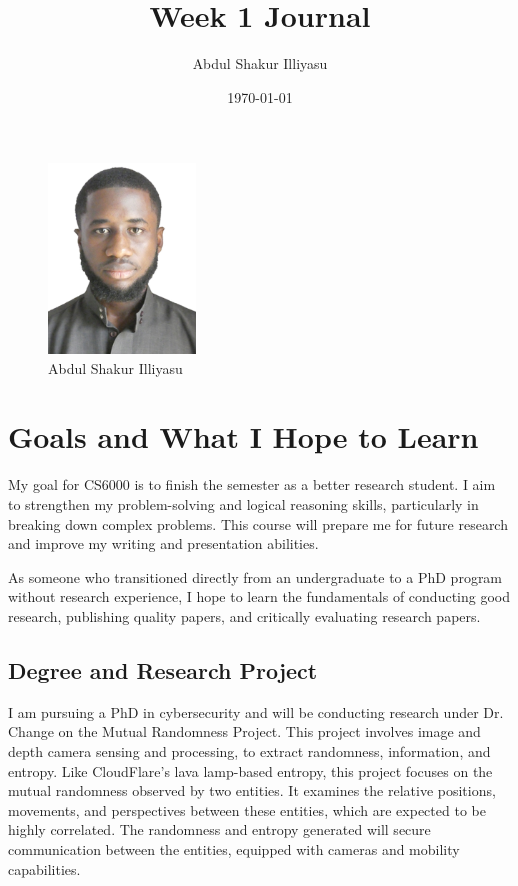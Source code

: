 \documentclass{article}
\title{Week 1 Journal}
\author{Abdul Shakur Illiyasu}
\date{\today}
\begin{document}
\maketitle

\begin{figure}[ht]
    \centering
    \includegraphics[width=0.35\textwidth]{images/abdul.jpg}
    \caption{Abdul Shakur Illiyasu}
    \label{fig: abdul.jpg}
\end{figure}

\section{Goals and What I Hope to Learn}

My goal for CS6000 is to finish the semester as a better research student. I aim to strengthen my problem-solving and logical reasoning skills, particularly in breaking down complex problems. This course will prepare me for future research and improve my writing and presentation abilities.

As someone who transitioned directly from an undergraduate to a PhD program without research experience, I hope to learn the fundamentals of conducting good research, publishing quality papers, and critically evaluating research papers.

\subsection{Degree and Research Project}
I am pursuing a PhD in cybersecurity and will be conducting research under Dr. Change on the Mutual Randomness Project. This project involves image and depth camera sensing and processing, to extract randomness, information, and entropy. Like CloudFlare’s lava lamp-based entropy, this project focuses on the mutual randomness observed by two entities. It examines the relative positions, movements, and perspectives between these entities, which are expected to be highly correlated. The randomness and entropy generated will secure communication between the entities, equipped with cameras and mobility capabilities.
\end{document}
